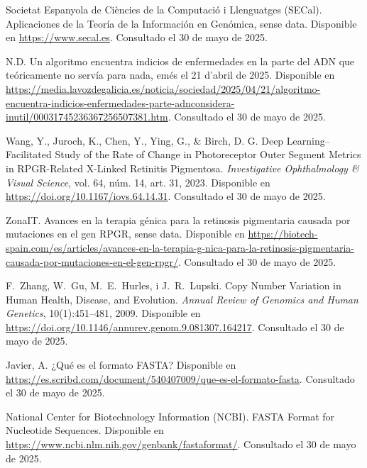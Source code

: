 \documentclass[11pt,spanish,listoffigures,listoftables]{tfgetsinf}
\begin{document}
\begin{thebibliography}{99}
   Societat Espanyola de Ciències de la Computació i Llenguatges (SECal).  
   \newblock Aplicaciones de la Teoría de la Información en Genómica,  
   sense data.  
   \newblock Disponible en  
   \url{https://www.secal.es}.
   \newblock Consultado el 30 de mayo de 2025.

   N.D.  
   \newblock Un algoritmo encuentra indicios de enfermedades en la parte del ADN que teóricamente no servía para nada,  
   emés el 21 d’abril de 2025.  
   \newblock Disponible en  
   \url{https://media.lavozdegalicia.es/noticia/sociedad/2025/04/21/algoritmo-encuentra-indicios-enfermedades-parte-adnconsidera-inutil/00031745236367256507381.htm}.
   \newblock Consultado el 30 de mayo de 2025.

   Wang, Y., Juroch, K., Chen, Y., Ying, G., \& Birch, D. G.  
   \newblock Deep Learning–Facilitated Study of the Rate of Change in Photoreceptor Outer Segment Metrics in RPGR-Related X-Linked Retinitis Pigmentosa.  
   \newblock \textit{Investigative Ophthalmology \& Visual Science}, vol. 64, núm. 14, art. 31, 2023.  
   \newblock Disponible en  
   \url{https://doi.org/10.1167/iovs.64.14.31}.
   \newblock Consultado el 30 de mayo de 2025.

   ZonaIT.  
   \newblock Avances en la terapia génica para la retinosis pigmentaria causada por mutaciones en el gen RPGR,  
   sense data.  
   \newblock Disponible en  
   \url{https://biotech-spain.com/es/articles/avances-en-la-terapia-g-nica-para-la-retinosis-pigmentaria-causada-por-mutaciones-en-el-gen-rpgr/}.
   \newblock Consultado el 30 de mayo de 2025.

   F.~Zhang, W.~Gu, M.~E.~Hurles, i J.~R.~Lupski.
   \newblock Copy Number Variation in Human Health, Disease, and Evolution.
   \newblock \textit{Annual Review of Genomics and Human Genetics}, 10(1):451--481, 2009.
   \newblock Disponible en
   \newblock \url{https://doi.org/10.1146/annurev.genom.9.081307.164217}.
   \newblock Consultado el 30 de mayo de 2025.
   
   Javier, A.  
   \newblock ¿Qué es el formato FASTA?    
   \newblock Disponible en 
   \newblock \url{https://es.scribd.com/document/540407009/que-es-el-formato-fasta}.
   \newblock Consultado el 30 de mayo de 2025.
 
   National Center for Biotechnology Information (NCBI).  
   \newblock FASTA Format for Nucleotide Sequences. 
   \newblock Disponible en 
   \newblock \url{https://www.ncbi.nlm.nih.gov/genbank/fastaformat/}.
   \newblock Consultado el 30 de mayo de 2025.
 

\end{thebibliography}
\end{document}
